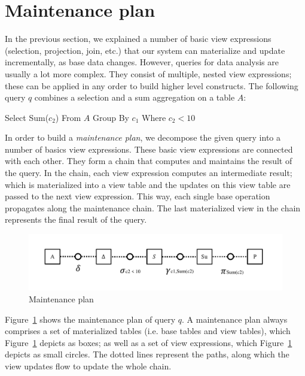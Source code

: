 \section{Maintenance plan}

In the previous section, we explained a number of basic view expressions 
(selection, projection, join, etc.) that our system can materialize and 
update incrementally, as base data changes. However, queries for data 
analysis are usually a lot more complex. They consist of multiple, 
nested view expressions; these can be applied in any order to build 
higher level constructs. The following query $q$ combines a selection 
and a sum aggregation on a table $A$: 


\begin{center} Select Sum($c_2$) From $A$ Group By $c_1$ Where $c_2 < 10$\end{center} 


In order to build a \textit{maintenance plan}, we decompose the given 
query into a number of basics view expressions. These basic view 
expressions are connected with each other. They form a chain that 
computes and maintains the result of the query. In the chain, each view 
expression computes an intermediate result; which is materialized into a 
view table and the updates on this view table are passed to the next 
view expression. This way, each single base operation propagates along 
the maintenance chain. The last materialized view in the chain 
represents the final result of the query. 





\begin{figure}[h!] 
	\centering 
	\includegraphics[width=\linewidth]{figures/MaintenanceExample}  
	\caption{Maintenance plan} 
	\label{fig:maintenance_plan} 
\end{figure} 



 Figure~\ref{fig:maintenance_plan} shows the maintenance plan of query 
$q$. A maintenance plan always comprises a set of materialized tables 
(i.e. base tables and view tables), which 
Figure~\ref{fig:maintenance_plan} depicts as boxes; as well as a set of 
view expressions, which Figure~\ref{fig:maintenance_plan} depicts as 
small circles. The dotted lines represent the paths, along which the 
view updates flow to update the whole chain. 

